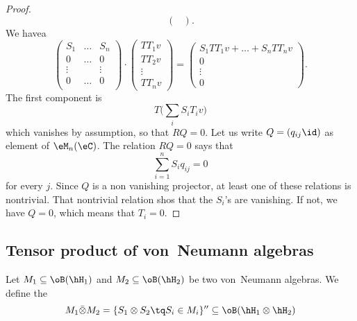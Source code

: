 \begin{proof}
\[\begin{pmatrix}
\end{pmatrix}.
\]
We havea
\[ 
\begin{pmatrix}
S_1&\ldots & S_n\\
0&\ldots & 0 \\
\vdots  &&\vdots\\
0&\ldots & 0 \\
\end{pmatrix}\cdot
  \begin{pmatrix}
TT_1 v\\
TT_2 v\\
\vdots\\
TT_nv
\end{pmatrix}
=
\begin{pmatrix}
S_1TT_1v+\ldots+S_nTT_nv\\
0\\
\vdots\\
0
\end{pmatrix}.
\]
The first component is
\[ 
  T\big( \sum_i S_iT_iv \big)
\]
which vanishes by assumption, so that $RQ=0$. Let us write $Q=(q_{ij}\id)$ as element of $\eM_n(\eC)$. The relation $RQ=0$ says that
\begin{equation}
		\sum_{i=1}^n S_iq_{ij}=0
\end{equation}
for every $j$. Since $Q$ is a non vanishing projector, at least one of these relations is nontrivial. That nontrivial relation shos that the $S_i$'s are vanishing. If not, we have $Q=0$, which means that $T_i=0$.
\end{proof}

					\subsection{Tensor product of von~Neumann algebras}

Let $M_1\subseteq\oB(\hH_1)$ and $M_2\subseteq\oB(\hH_2)$ be two von~Neumann algebras. We define the 
\begin{equation}
	M_1\bar\otimes M_2=\{ S_1\otimes S_2\tq S_i\in M_i \}''\subseteq\oB(\hH_1\otimes\hH_2)
\end{equation}

